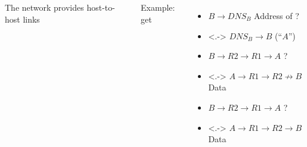 \begin{frame}[fragile]
\begin{columns}[c,onlytextwidth]
    The network provides host-to-host links
    
    Example: get 

    \setcounter{beamerpauses}{2}
    {
      \setlength{\leftmargini}{.7em}
      \begin{itemize}
        \item<+-> $B \rightarrow DNS_B$ \hfill Address of ?
        \item<.-> $DNS_B \rightarrow B$ \hfill {} (``$A$'')
        \item<+-> $B \rightarrow R2 \rightarrow R1 \rightarrow A$ \hfill {}?
        \item<.-> $A \rightarrow R1 \rightarrow R2 \not\rightarrow B$ \hfill Data
        \item<+-> \textcolor{.!50}{$B \rightarrow R2 \rightarrow R1 \rightarrow A$ \hfill {}?}
        \item<.-> $A \rightarrow R1 \rightarrow R2 \rightarrow B$ \hfill Data
      \end{itemize}
    }
  \end{columns}
\end{frame}


